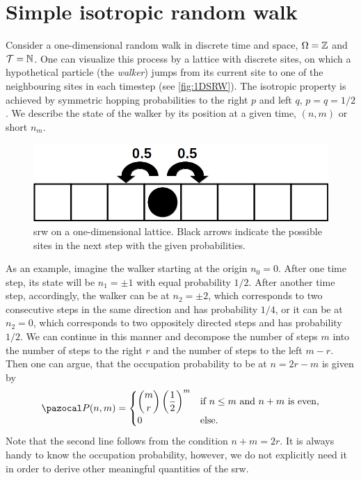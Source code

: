 \section{Simple isotropic random walk}\label{sec:SIRW}
Consider a one-dimensional random walk in discrete time and space, \ie $\Omega = \operatorname{\mathbb{Z}}$ and $\mathcal{T} = \operatorname{\mathbb{N}}$. One can visualize this process by a lattice with discrete sites, on which a hypothetical particle (the \textit{walker}) jumps from its current site to one of the neighbouring sites in each timestep (see \autoref{fig:1DSRW}). The isotropic property is achieved by symmetric hopping probabilities to the right $p$ and left $q$, \ie $p = q =1/2$. We describe the state of the walker by its position at a given time, \ie $(n,m)$ or short $n_m$.

\begin{figure}[bth]
 \myfloatalign
 \includegraphics[width=0.8\linewidth]{gfx/1DSRW}
 \caption[\acl{srw} on a one-dimensional lattice]{\ac{srw} on a one-dimensional lattice. Black arrows indicate the possible sites in the next step with the given probabilities.}\label{fig:1DSRW}
\end{figure}

As an example, imagine the walker starting at the origin $n_0 = 0$. After one time step, its state will be $n_1=\pm 1$ with equal probability $1/2$. After another time step, accordingly, the walker can be at \mbox{$n_2=\pm 2$}, which corresponds to two consecutive steps in the same direction and has probability $1/4$, or it can be at $n_2=0$, which corresponds to two oppositely directed steps and has probability $1/2$. We can continue in this manner and decompose the number of steps $m$ into the number of steps to the right $r$ and the number of steps to the left $m-r$. Then one can argue, that the occupation probability to be at $n=2r-m$ is given by
\begin{equation*}\label{eq:srw-prob-distr}
 \P(n,m) =
 \begin{cases}
  \dbinom{m}{r}\left(\dfrac{1}{2}\right)^m & \textrm{if $n \leq m$ and $n+m$ is even}, \\
  0 & \textrm{else}.
 \end{cases}
\end{equation*}
Note that the second line follows from the condition $n+m=2r$. It is always handy to know the occupation probability, however, we do not explicitly need it in order to derive other meaningful quantities of the \ac{srw}.

